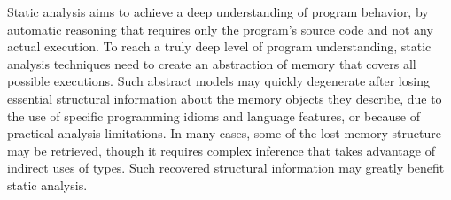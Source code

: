 
Static analysis aims to achieve a deep understanding of program
behavior, by automatic reasoning that requires only the program's
source code and not any actual execution. To reach a truly deep level
of program understanding, static analysis techniques need to create an
abstraction of memory that covers all possible executions. Such
abstract models may quickly degenerate after losing essential
structural information about the memory objects they describe, due to
the use of specific programming idioms and language features, or
because of practical analysis limitations. In many cases, some of the
lost memory structure may be retrieved, though it requires complex
inference that takes advantage of indirect uses of types. Such
recovered structural information may greatly benefit static analysis.

